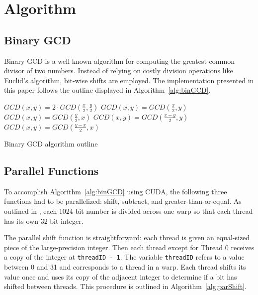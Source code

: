 \documentclass[smallextended]{svjour3}       %
\begin{document}

\section{Algorithm}
\label{sec:alg}

\subsection{Binary GCD}
\label{subsec:binGCD}
Binary GCD is a well known algorithm for computing the greatest common divisor 
of two numbers. Instead of relying on costly division operations like Euclid's 
algorithm, bit-wise shifts are employed. The implementation
presented in this paper follows the outline displayed in
Algorithm~\ref{alg:binGCD}.

\begin{algorithm}
   \nl{} {
      \nl{} {
         \nl$GCD(x, y) = 2 \cdot GCD(\frac{x}{2}, \frac{y}{2})$\;
      }\nl{} {
         \nl$GCD(x, y) = GCD(\frac{x}{2}, y)$\;
      }\nl{} {
         \nl$GCD(x, y) = GCD(\frac{y}{2}, x)$\;
      }\nl{} {
         \nl{} {
            \nl$GCD(x, y) = GCD(\frac{x - y}{2}, y)$\;
         }{
            \nl$GCD(x, y) = GCD(\frac{y - x}{2}, x)$\;
        }
      }
   }
   \caption{Binary GCD algorithm outline}
   \label{alg:binGCD}
\end{algorithm}

\subsection{Parallel Functions}
\label{subsec:parfunc}
To accomplish Algorithm~\ref{alg:binGCD} using CUDA, the following three 
functions had to be parallelized: shift, subtract, and greater-than-or-equal.
As outlined in \cite{fujimoto2009high}, each 1024-bit number is divided across
one warp so that each thread has its own 32-bit integer. 

The parallel shift function is straightforward: each thread is given an 
equal-sized piece of the large-precision integer. Then each thread except for 
Thread 0 receives a copy of the integer at \texttt{threadID  - 1}. The variable
\texttt{threadID} refers to a value between 0 and 31 and corresponds to a
thread in a warp. Each thread shifts its value once and uses its copy of the
adjacent integer to determine if a bit has shifted between threads. This
procedure is outlined in Algorithm~\ref{alg:parShift}.
\end{document}
